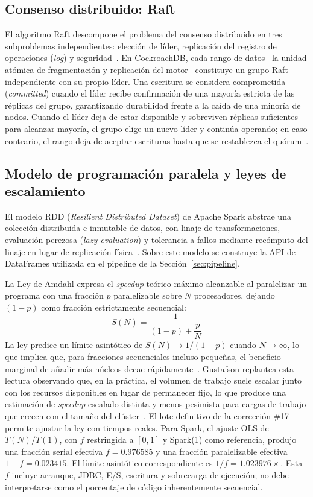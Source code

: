 \documentclass[10pt,twocolumn]{article}
\begin{document}
\subsection{Consenso distribuido: Raft}
\label{sec:consenso}

El algoritmo Raft descompone el problema del consenso distribuido en tres
subproblemas independientes: elección de líder, replicación del registro de
operaciones (\emph{log}) y seguridad~\cite{ongaro2014raft}. En CockroachDB, cada
rango de datos --la unidad atómica de fragmentación y replicación del
motor-- constituye un grupo Raft independiente con su propio líder. Una
escritura se considera comprometida (\emph{committed}) cuando el líder
recibe confirmación de una mayoría estricta de las réplicas del grupo,
garantizando durabilidad frente a la caída de una minoría de nodos. Cuando
el líder deja de estar disponible y sobreviven réplicas suficientes para
alcanzar mayoría, el grupo elige un nuevo líder y continúa operando; en caso
contrario, el rango deja de aceptar escrituras hasta que se restablezca el
quórum~\cite{taft2020,ongaro2014raft}.

\subsection{Modelo de programación paralela y leyes de escalamiento}

El modelo RDD (\emph{Resilient Distributed Dataset}) de Apache Spark
abstrae una colección distribuida e inmutable de datos, con linaje de
transformaciones, evaluación perezosa (\emph{lazy evaluation}) y tolerancia
a fallos mediante recómputo del linaje en lugar de replicación
física~\cite{zaharia2012rdd}. Sobre este modelo se construye la API de
DataFrames utilizada en el pipeline de la Sección~\ref{sec:pipeline}.

La Ley de Amdahl expresa el \emph{speedup} teórico máximo alcanzable al
paralelizar un programa con una fracción $p$ paralelizable sobre $N$
procesadores, dejando $(1-p)$ como fracción estrictamente secuencial:
\begin{equation}
S(N) = \frac{1}{(1-p) + \dfrac{p}{N}}
\label{eq:amdahl}
\end{equation}
La ley predice un límite asintótico de $S(N) \to 1/(1-p)$ cuando
$N \to \infty$, lo que implica que, para fracciones secuenciales incluso
pequeñas, el beneficio marginal de añadir más núcleos decae
rápidamente~\cite{poolla2023amdahl}. Gustafson replantea esta lectura observando
que, en la práctica, el volumen de trabajo suele escalar junto con los
recursos disponibles en lugar de permanecer fijo, lo que produce una
estimación de \emph{speedup} escalado distinta y menos pesimista para
cargas de trabajo que crecen con el tamaño del clúster~\cite{sun2023gustafson}.
El lote definitivo de la corrección \#17 permite ajustar la ley con tiempos
reales. Para Spark, el ajuste OLS de $T(N)/T(1)$, con $f$ restringida a
$[0,1]$ y Spark(1) como referencia, produjo una fracción serial efectiva
$f=0.976585$ y una fracción paralelizable efectiva $1-f=0.023415$. El límite
asintótico correspondiente es $1/f=1.023976\times$. Esta $f$ incluye arranque,
JDBC, E/S, escritura y sobrecarga de ejecución; no debe interpretarse como
el porcentaje de código inherentemente secuencial.
\end{document}
